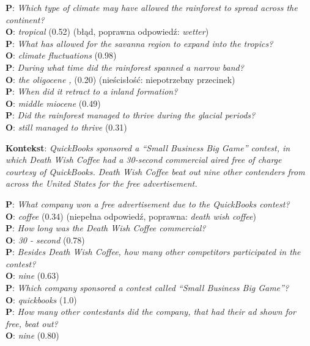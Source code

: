 \noindent
\textbf{P}: \textit{Which type of climate may have allowed the rainforest to spread across the continent?}\\
\textbf{O}: \textit{tropical} (0.52) (błąd, poprawna odpowiedź: \textit{wetter})\\[4pt]
\textbf{P}: \textit{What has allowed for the savanna region to expand into the tropics?}\\
\textbf{O}: \textit{climate fluctuations} (0.98)\\[4pt]
\textbf{P}: \textit{During what time did the rainforest spanned a narrow band?}\\
\textbf{O}: \textit{the oligocene ,} (0.20) (nieścisłość: niepotrzebny przecinek)\\[4pt]
\textbf{P}: \textit{When did it retract to a inland formation?}\\
\textbf{O}: \textit{middle miocene} (0.49)\\[4pt]
\textbf{P}: \textit{Did the rainforest managed to thrive during the glacial periods?}\\
\textbf{O}: \textit{still managed to thrive} (0.31)

\vspace{.3cm}

\noindent
\textbf{Kontekst}:
\textit{QuickBooks sponsored a ``Small Business Big Game'' contest, in which Death Wish Coffee had a 30-second commercial aired free of charge courtesy of QuickBooks. Death Wish Coffee beat out nine other contenders from across the United States for the free advertisement.}

\noindent
\textbf{P}: \textit{What company won a free advertisement due to the QuickBooks contest?}\\
\textbf{O}: \textit{coffee} (0.34) (niepełna odpowiedź, poprawna: \textit{death wish coffee})\\[4pt]
\textbf{P}: \textit{How long was the Death Wish Coffee commercial?}\\
\textbf{O}: \textit{30 - second} (0.78)\\[4pt]
\textbf{P}: \textit{Besides Death Wish Coffee, how many other competitors participated in the contest?}\\
\textbf{O}: \textit{nine} (0.63)\\[4pt]
\textbf{P}: \textit{Which company sponsored a contest called ``Small Business Big Game''?}\\
\textbf{O}: \textit{quickbooks} (1.0)\\[4pt]
\textbf{P}: \textit{How many other contestants did the company, that had their ad shown for free, beat out?}\\
\textbf{O}: \textit{nine} (0.80)


